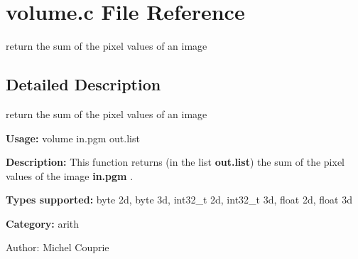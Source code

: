 \section{volume.c File Reference}
\label{volume_8c}
return the sum of the pixel values of an image  




\label{_details}
\subsection{Detailed Description}
return the sum of the pixel values of an image 

{\bf Usage:} volume in.pgm out.list

{\bf Description:} This function returns (in the list {\bf out.list}) the sum of the pixel values of the image {\bf in.pgm} .

{\bf Types supported:} byte 2d, byte 3d, int32\_\-t 2d, int32\_\-t 3d, float 2d, float 3d

{\bf Category:} arith

\begin{Desc}
\item[Author:]Michel Couprie \end{Desc}
